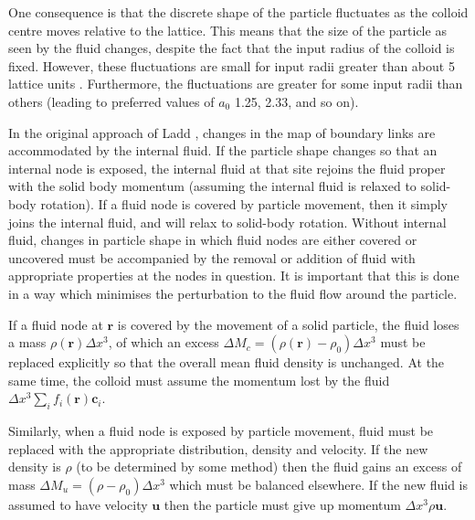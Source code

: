 One consequence is that the discrete shape of the particle fluctuates
as the colloid centre moves relative to the
lattice. This means that the size of the particle as seen by the
fluid changes, despite the fact that the input radius of the colloid
is fixed.  However, these fluctuations are small for input radii
greater than about 5 lattice units \cite{l96a}. Furthermore, the
fluctuations are greater for some input radii than others
(leading to preferred values of $a_0$ 1.25, 2.33, and so on).

In the original approach of Ladd \cite{l96a}, changes in the map of
boundary links are accommodated by the internal fluid. If the particle
shape changes so that an internal node is exposed, the internal fluid
at that site rejoins the fluid proper with the solid body momentum
(assuming the internal fluid is relaxed to solid-body rotation).
If a fluid node is covered by particle movement, then it simply
joins the internal fluid, and will relax to solid-body rotation.
Without internal fluid, changes in particle shape in which fluid nodes
are either covered or uncovered must be accompanied by the removal or
addition of fluid with appropriate properties at the nodes in question.
It is important that this is done in a way which minimises the
perturbation to the fluid flow around the particle.

If a fluid node at $\mathbf{r}$ is covered by the movement of a
solid particle, the fluid loses a mass $\rho(\mathbf{r}) \Delta x^3$,
of which an excess $\Delta M_c = (\rho(\mathbf{r}) - \rho_0)\Delta x^3$
must be replaced explicitly so that the overall mean fluid density is
unchanged. At the same time, the colloid must assume the momentum lost
by the fluid
$\Delta x^3 \sum_i f_i(\mathbf{r}) \mathbf{c}_i$.

Similarly, when a fluid node is exposed by particle movement,
fluid must be replaced with the appropriate distribution, density
and velocity. If the
new density is $\rho$ (to be determined by some method) then
the fluid gains an excess of mass $\Delta M_u = (\rho - \rho_0)
\Delta x^3$ which must be balanced elsewhere. If the new fluid
is assumed to have velocity $\mathbf{u}$ then the particle must
give up momentum $\Delta x^3 \rho\mathbf{u}$.

